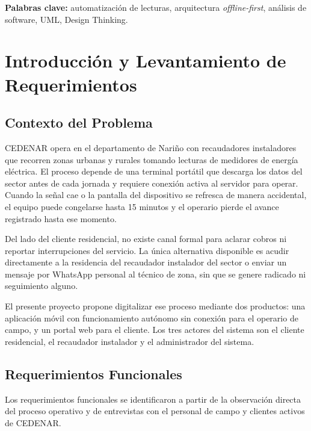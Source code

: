 \documentclass[12pt, a4paper]{article}
\begin{document}
\vspace{6pt}
\noindent\textbf{Palabras clave:} automatización de lecturas, arquitectura \textit{offline-first}, análisis de software, UML, Design Thinking.

\newpage
\tableofcontents
\newpage

\section{Introducción y Levantamiento de Requerimientos}

\subsection{Contexto del Problema}

\noindent CEDENAR opera en el departamento de Nariño con recaudadores instaladores que recorren zonas urbanas y rurales tomando lecturas de medidores de energía eléctrica. El proceso depende de una terminal portátil que descarga los datos del sector antes de cada jornada y requiere conexión activa al servidor para operar. Cuando la señal cae o la pantalla del dispositivo se refresca de manera accidental, el equipo puede congelarse hasta 15 minutos y el operario pierde el avance registrado hasta ese momento.

Del lado del cliente residencial, no existe canal formal para aclarar cobros ni reportar interrupciones del servicio. La única alternativa disponible es acudir directamente a la residencia del recaudador instalador del sector o enviar un mensaje por WhatsApp personal al técnico de zona, sin que se genere radicado ni seguimiento alguno.

El presente proyecto propone digitalizar ese proceso mediante dos productos: una aplicación móvil con funcionamiento autónomo sin conexión para el operario de campo, y un portal web para el cliente. Los tres actores del sistema son el cliente residencial, el recaudador instalador y el administrador del sistema.

\subsection{Requerimientos Funcionales}

Los requerimientos funcionales se identificaron a partir de la observación directa del proceso operativo y de entrevistas con el personal de campo y clientes activos de CEDENAR.
\end{document}
